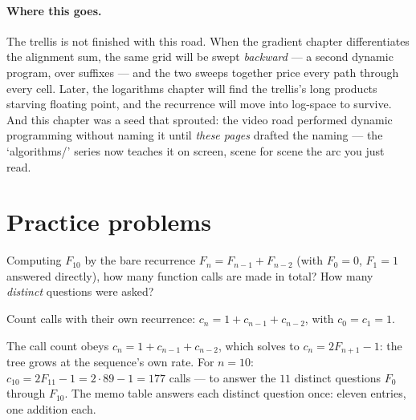 \begin{narrative}
\paragraph{Where this goes.} The trellis is not finished with this
road. When the gradient chapter differentiates the alignment sum, the
same grid will be swept \emph{backward} — a second dynamic program,
over suffixes — and the two sweeps together price every path through
every cell. Later, the logarithms chapter will find the trellis's
long products starving floating point, and the recurrence will move
into log-space to survive. And this chapter was a seed that
sprouted: the video road performed dynamic programming without naming
it until \emph{these pages} drafted the naming — the `algorithms/'
series now teaches it on screen, scene for scene the arc you just
read.
\end{narrative}

\section*{Practice problems}

\begin{problem}
Computing $F_{10}$ by the bare recurrence $F_n = F_{n-1} + F_{n-2}$
(with $F_0 = 0$, $F_1 = 1$ answered directly), how many function calls
are made in total? How many \emph{distinct} questions were asked?
\begin{hint}
Count calls with their own recurrence: $c_n = 1 + c_{n-1} + c_{n-2}$,
with $c_0 = c_1 = 1$.
\end{hint}
\begin{solution}
The call count obeys $c_n = 1 + c_{n-1} + c_{n-2}$, which solves to
$c_n = 2F_{n+1} - 1$: the tree grows at the sequence's own rate. For
$n = 10$: $c_{10} = 2F_{11} - 1 = 2 \cdot 89 - 1 = 177$ calls — to
answer the $11$ distinct questions $F_0$ through $F_{10}$. The memo
table answers each distinct question once: eleven entries, one
addition each.
\end{solution}
\end{problem}

